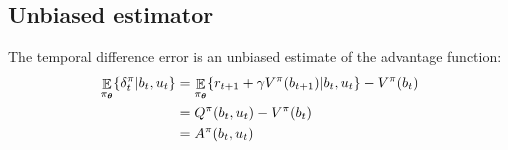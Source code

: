 \begin{appendices}


\section{Unbiased estimator}\label{app:unbiased_delta}

The temporal difference error is an unbiased estimate of the advantage function:
\begin{align}
  \displaystyle \mathop \mathbb{E}_{\pi_{\boldsymbol{\theta}}} \{ \delta^{\pi}_t|b_t,u_t\} &=  \mathop\mathbb{E}_{\pi_{\boldsymbol{\theta}}}\{ r_{t+1} + \gamma V^{\pi}(b_{t+1})|b_t,u_t\} - V^{\pi}(b_t) \nonumber \\
									   &= Q^{\pi}(b_t,u_t) - V^{\pi}(b_t) \nonumber \\
									   &= A^{\pi}(b_t,u_t)
\end{align}



\end{appendices}
